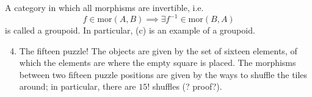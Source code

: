 A category in which all morphisms are invertible, i.e.
\[ f \in \mathrm{mor}(A, B) \implies \exists f^{-1} \in \mathrm{mor}(B, A) \]
is called a groupoid. In particular, (c) is an example of a groupoid.
\begin{enumerate}[label=(\alph*)]
    \setcounter{enumi}{3}
    \item The fifteen puzzle! The objects are given by the set of sixteen elements, of which the elements are where the empty square is placed. The morphisms between two fifteen puzzle positions are given by the ways to shuffle the tiles around; in particular, there are $15!$ shuffles (? proof?).
\end{enumerate}
